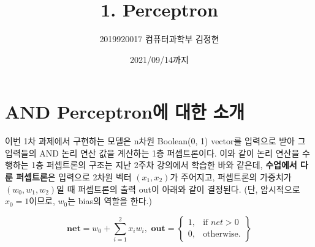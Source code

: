 \documentclass[letterpaper,10pt]{article}
\begin{document}
\title{1. Perceptron}
\author{2019920017 컴퓨터과학부 김정현}
\date{2021/09/14까지}
\maketitle

\section{AND Perceptron에 대한 소개}

이번 1차 과제에서 구현하는 모델은 n차원 Boolean(0, 1) vector를 입력으로 받아 그 입력들의 AND 논리 연산 값을 계산하는 1층 퍼셉트론이다. 이와 같이 논리 연산을 수행하는 1층 퍼셉트론의 구조는 지난 2주차 강의에서 학습한 바와 같은데, \textbf{수업에서 다룬 퍼셉트론}은 입력으로 2차원 벡터 $(x_1, x_2)$가 주어지고, 퍼셉트론의 가중치가 $(w_0, w_1, w_2)$일 때 퍼셉트론의 출력 out이 아래와 같이 결정된다. (단, 암시적으로 $x_0=1$이므로, $w_0$는 bias의 역할을 한다.)

\[
\textbf{net}=w_0 + \sum_{i=1}^{2} x_i w_i, \textbf{ out}=\left.
\begin{cases}
    1, & \text{if }net > 0\\
    0, & \text{otherwise.}
\end{cases}
\right\}
\]
\end{document}
